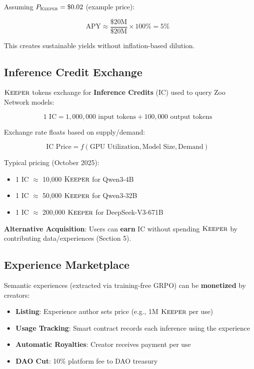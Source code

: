 \documentclass[11pt,letterpaper]{article}
\theoremstyle{definition}
\theoremstyle{remark}
\newcommand{\KEEPER}{\textsc{Keeper}}
\begin{document}
Assuming $P_{\KEEPER} = \$0.02$ (example price):

\begin{equation}
\text{APY} \approx \frac{\$20\text{M}}{\$20\text{M}} \times 100\% = 5\%
\end{equation}

This creates sustainable yields without inflation-based dilution.

\subsection{Inference Credit Exchange}

$\KEEPER$ tokens exchange for \textbf{Inference Credits} (IC) used to query Zoo Network models:

\begin{equation}
1 \text{ IC} = 1,000,000 \text{ input tokens} + 100,000 \text{ output tokens}
\end{equation}

Exchange rate floats based on supply/demand:

\begin{equation}
\text{IC Price} = f(\text{GPU Utilization}, \text{Model Size}, \text{Demand})
\end{equation}

Typical pricing (October 2025):
\begin{itemize}
\item 1 IC $\approx$ 10,000 $\KEEPER$ for Qwen3-4B
\item 1 IC $\approx$ 50,000 $\KEEPER$ for Qwen3-32B
\item 1 IC $\approx$ 200,000 $\KEEPER$ for DeepSeek-V3-671B
\end{itemize}

\textbf{Alternative Acquisition}: Users can \textbf{earn} IC without spending $\KEEPER$ by contributing data/experiences (Section 5).

\subsection{Experience Marketplace}

Semantic experiences (extracted via training-free GRPO) can be \textbf{monetized} by creators:

\begin{itemize}
\item \textbf{Listing}: Experience author sets price (e.g., 1M $\KEEPER$ per use)
\item \textbf{Usage Tracking}: Smart contract records each inference using the experience
\item \textbf{Automatic Royalties}: Creator receives payment per use
\item \textbf{DAO Cut}: 10\% platform fee to DAO treasury
\end{itemize}
\end{document}
